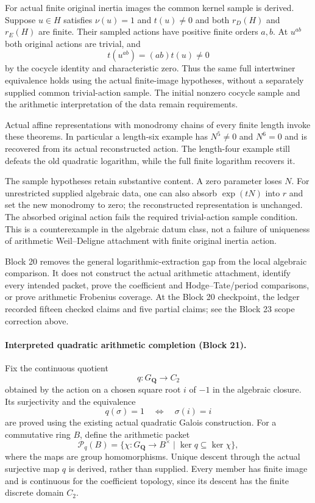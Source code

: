 \documentclass[11pt]{article}
\theoremstyle{definition}
\theoremstyle{remark}
\newcommand{\Q}{\mathbf Q}
\begin{document}
For actual finite original inertia images the common kernel sample is
derived. Suppose $u\in H$ satisfies $\nu(u)=1$ and $t(u)\ne0$ and both
$r_D(H)$ and $r_E(H)$ are finite. Their sampled actions have positive
finite orders $a,b$. At $u^{ab}$ both original actions are trivial, and
\[
t(u^{ab})=(ab)t(u)\ne0
\]
by the cocycle identity and characteristic zero. Thus the same full
intertwiner equivalence holds using the actual finite-image hypotheses,
without a separately supplied common trivial-action sample. The initial
nonzero cocycle sample and the arithmetic interpretation of the data
remain requirements.

Actual affine representations with monodromy chains of every finite
length invoke these theorems. In particular a length-six example has
$N^5\ne0$ and $N^6=0$ and is recovered from its actual reconstructed action.
The length-four example still defeats the old quadratic logarithm, while
the full finite logarithm recovers it.

The sample hypotheses retain substantive content. A zero parameter loses
$N$. For unrestricted supplied algebraic data, one can also absorb
$\exp(tN)$ into $r$ and set the new monodromy to zero; the reconstructed
representation is unchanged. The absorbed original action fails the
required trivial-action sample condition. This is a counterexample in the
algebraic datum class, not a failure of uniqueness of arithmetic
Weil--Deligne attachment with finite original inertia action.

Block 20 removes the general logarithmic-extraction gap from the local
algebraic comparison. It does not construct the actual arithmetic
attachment, identify every intended packet, prove the coefficient and
Hodge--Tate/period comparisons, or prove arithmetic Frobenius coverage.
At the Block 20 checkpoint, the ledger recorded fifteen checked claims
and five partial claims; see the Block 23 scope correction above.



\paragraph{Interpreted quadratic arithmetic completion (Block 21).}
Fix the continuous quotient
\[
q:G_{\Q}\longrightarrow C_2
\]
obtained by the action on a chosen square root $i$ of $-1$ in the algebraic
closure. Its surjectivity and the equivalence
\[
q(\sigma)=1\quad\Longleftrightarrow\quad\sigma(i)=i
\]
are proved using the existing actual quadratic Galois construction.
For a commutative ring $B$, define the arithmetic packet
\[
\mathcal P_q(B)=
\{\chi:G_{\Q}\longrightarrow B^\times\mid\ker q\subseteq\ker\chi\},
\]
where the maps are group homomorphisms. Unique descent through the actual
surjective map $q$ is derived, rather than supplied. Every member has finite
image and is continuous for the coefficient topology, since its descent
has the finite discrete domain $C_2$.
\end{document}
